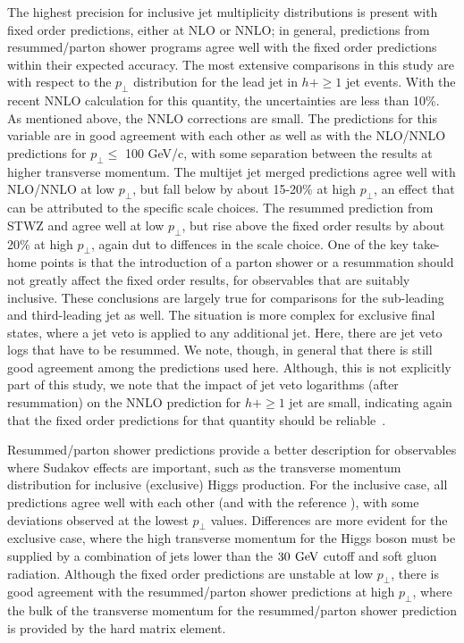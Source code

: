 The highest precision for inclusive jet multiplicity distributions is 
present with fixed order predictions, either at NLO or NNLO; in general, 
predictions from resummed/parton shower programs agree well with the 
fixed order predictions within their expected accuracy. The most 
extensive comparisons in this study are with respect to the $p_\perp$ 
distribution for the lead jet in $h+\ge1$ jet events. With the recent 
NNLO calculation for this quantity, the uncertainties are less than 10\%. 
As mentioned above, the NNLO corrections are small. The \NNLOPS 
predictions for this variable are in good agreement with each other 
as well as with the NLO/NNLO predictions for $p_\perp \le$ 100 GeV/c, with 
some separation between the \NNLOPS results at higher transverse momentum. 
The multijet jet merged predictions agree well with NLO/NNLO at low $p_\perp$, 
but fall below by about 15-20\% at high $p_\perp$, an effect that can be attributed 
to the specific scale choices. The resummed prediction from STWZ and \Resbos 
agree well at low $p_\perp$, but rise above the fixed order results 
by about 20\% at high $p_\perp$, again dut to diffences in the scale choice. 
One of the key take-home points is that 
the introduction of a parton shower or a resummation should not greatly 
affect the fixed order results, for observables that are suitably 
inclusive. These conclusions are largely true for comparisons for the 
sub-leading and third-leading jet as well. The situation is more complex 
for exclusive final states, where a jet veto is applied to any additional 
jet. Here, there are jet veto logs that have to be resummed. We note, 
though, in general that there is still good agreement among the 
predictions used here. Although, this is not explicitly part of this 
study, we note that the impact of jet veto logarithms (after resummation) 
on the NNLO prediction for $h+\ge1$ jet are small, indicating again that 
the fixed order predictions for that quantity should be 
reliable~\cite{Banfi:2012jm,Banfi:2015pju}.

Resummed/parton shower predictions provide a better description for 
observables where Sudakov effects are important, such as the transverse 
momentum distribution for inclusive (exclusive) Higgs production. For 
the inclusive case, all predictions agree well with each other (and with 
the reference \HqT), with some deviations observed at the lowest $p_\perp$ 
values. Differences are more evident for the exclusive case, where the 
high transverse momentum for the Higgs boson must be supplied by a combination of 
jets lower than the $30\,\text{\:GeV}$ cutoff and soft gluon radiation. Although 
the fixed order predictions are unstable at low $p_\perp$, there is good 
agreement with the resummed/parton shower predictions at high $p_\perp$, 
where the bulk of the transverse momentum for the resummed/parton shower 
prediction is provided by the hard matrix element. 

